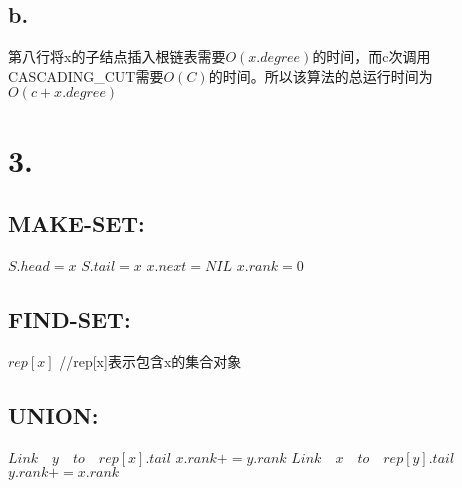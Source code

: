 \documentclass[UTF8, 11pt]{ctexart}
\begin{document}
	\subsection*{b.}
	\par{第八行将x的子结点插入根链表需要$O(x.degree)$的时间，而c次调用CASCADING\_CUT需要$O(C)$的时间。所以该算法的总运行时间为$O(c+x.degree)$}
	\section*{3.}
	\subsection*{MAKE-SET:}
    \State $S.head=x$  
    \State $S.tail=x$
    \State $x.next=NIL$
    \State $x.rank=0$
    \EndFunction  
    \subsection*{FIND-SET:}
    \State \Return $rep[x]$  //rep[x]表示包含x的集合对象
    \EndFunction  
    \subsection*{UNION:}
        \State $Link\quad y\quad to\quad rep[x].tail$
        \State $x.rank+=y.rank$
    \Else
        \State $Link\quad x\quad to\quad rep[y].tail$
        \State $y.rank+=x.rank$
\end{document}
